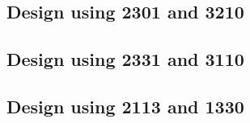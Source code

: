\subsection{Design using 2301 and 3210}


 \begin{center}




 \end{center}



\subsection{Design using 2331 and 3110}


 \begin{center}




 \end{center}



\subsection{Design using 2113 and 1330}


 \begin{center}




 \end{center}



